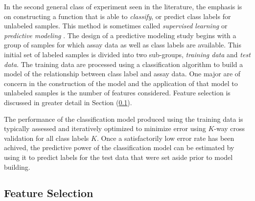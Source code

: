 In the second general class of experiment seen in the literature, the emphasis
is on constructing a function that is able to \emph{classify}, or predict class
labels for unlabeled samples.  This method is sometimes called \emph{supervised
learning} or \emph{predictive modeling} \cite{Dubitzky2003IMD}.  The design of
a predictive modeling study begins with a group of samples for which assay data
as well as class labels are available.  This initial set of labeled samples is
divided into two sub-groups, \emph{training data} and \emph{test data}.  The
training data are processed using a classification algorithm to build a model
of the relationship between class label and assay data.  One major are of
concern in the construction of the model and the application of that model to
unlabeled samples is the number of features considered.  Feature selection is
discussed in greater detail in Section (\ref{Feature Selection}).

The performance of the classification model produced using the training data is
typically assessed and iteratively optimized to minimize error using $K$-way
cross validation for all class labels $K$.  Once a satisfactorily low error
rate has been achived, the predictive power of the classification model can be
estimated by using it to predict labels for the test data that were set aside
prior to model building.

\subsection{Feature Selection}
\label{Feature Selection}


